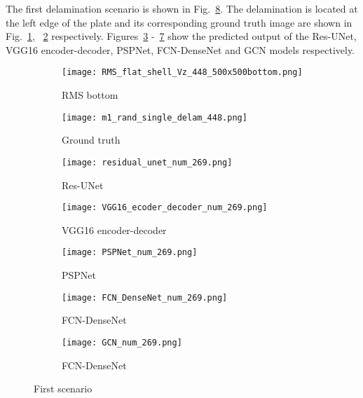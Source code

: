 The first delamination scenario is shown in Fig.~\ref{fig:softmax_448}. 
The delamination is located at the left edge of the plate and its corresponding ground truth image are shown in Fig.~\ref{fig:RMS_flat_shell_Vz_448}, ~\ref{fig:m1_rand_single_delam_448} respectively. 
Figures~\ref{fig:unet_pred_448} -~\ref{fig:gcn_pred_448} show the predicted output of the Res-UNet, VGG16 encoder-decoder, PSPNet, FCN-DenseNet and GCN models respectively. 
\begin{figure} [!h]
	\centering
	\begin{subfigure}[b]{0.47\textwidth}
		\centering
		\texttt{[image: RMS\_flat\_shell\_Vz\_448\_500x500bottom.png]}
		\caption{RMS bottom}
		\label{fig:RMS_flat_shell_Vz_448}
	\end{subfigure}
	\hfill
	\begin{subfigure}[b]{0.47\textwidth}
		\centering
		\texttt{[image: m1\_rand\_single\_delam\_448.png]}
		\caption{Ground truth}
		\label{fig:m1_rand_single_delam_448}
	\end{subfigure}
	\begin{subfigure}[b]{0.47\textwidth}
		\centering
		\texttt{[image: residual\_unet\_num\_269.png]}
		\caption{Res-UNet}
		\label{fig:unet_pred_448}
	\end{subfigure}
	\hfill
	\begin{subfigure}[b]{0.47\textwidth}
		\centering
		\texttt{[image: VGG16\_ecoder\_decoder\_num\_269.png]}
		\caption{VGG16 encoder-decoder}
		\label{fig:vgg16_pred_448}
	\end{subfigure}
	\hfill
	\begin{subfigure}[b]{0.47\textwidth}
		\centering
		\texttt{[image: PSPNet\_num\_269.png]}
		\caption{PSPNet}
		\label{fig:pspnet_pred_448}
	\end{subfigure}
	\hfill
	\begin{subfigure}[b]{0.47\textwidth}
		\centering
		\texttt{[image: FCN\_DenseNet\_num\_269.png]}
		\caption{FCN-DenseNet}
		\label{fig:fcn_densenet_pred_448}
	\end{subfigure}
	\hfill
	\begin{subfigure}[b]{0.47\textwidth}
		\centering
		\texttt{[image: GCN\_num\_269.png]}
		\caption{FCN-DenseNet}
		\label{fig:gcn_pred_448}
	\end{subfigure}

	\caption{First scenario}
	\label{fig:softmax_448}
\end{figure} 
